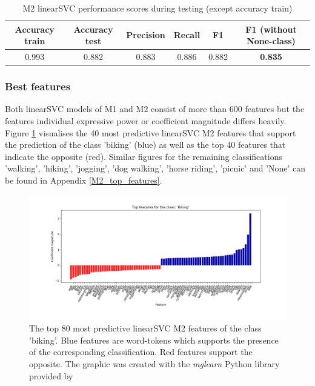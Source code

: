 \begin{table}[h!]
\begin{center}
\caption{M2 linearSVC performance scores during testing (except accuracy train)}\vspace{1ex}
\label{tab:m2_linearSVC_bestscores}
\begin{tabular}{cccccc}\hline
Accuracy train & Accuracy test & Precision & Recall & F1 & F1 (without None-class)\\ \hline
0.993 & 0.882 & 0.883 & 0.886 & 0.882 & \textbf{0.835} \\ \hline
\end{tabular}
\end{center}
\end{table}

\subsubsection{Best features}
Both linearSVC models of M1 and M2 consist of more than 600 features but the features individual expressive power or coefficient magnitude differs heavily. Figure \ref{fig:M2_top40_features_biking} visualises the 40 most predictive linearSVC M2 features that support the prediction of the class 'biking' (blue) as well as the top 40 features that indicate the opposite (red). Similar figures for the remaining classifications 'walking', 'hiking', 'jogging', 'dog walking', 'horse riding', 'picnic' and 'None' can be found in Appendix \ref{M2_top_features}.

\begin{figure}[h!]
   \centering
   \includegraphics[width=\textwidth]{img/m2_top_40_features_Biking_cropped.pdf}
   \caption{The top 80 most predictive linearSVC M2 features of the class 'biking'. Blue features are word-tokens which supports the presence of the corresponding classification. Red features support the opposite. The graphic was created with the \textit{mglearn} Python library provided by \textcite{Guido2016}}
   \label{fig:M2_top40_features_biking}
\end{figure}

